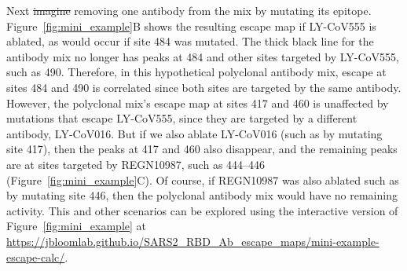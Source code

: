 \documentclass[9pt,twocolumn,twoside]{gsajnl_modified}
\providecommand{\DIFadd}[1]{{\protect\color{blue}\uwave{#1}}} %
\providecommand{\DIFdel}[1]{{\protect\color{red}\sout{#1}}}                      %
\providecommand{\DIFaddbegin}{} %
\providecommand{\DIFaddend}{} %
\providecommand{\DIFdelbegin}{} %
\providecommand{\DIFdelend}{} %
\begin{document}
Next \DIFdelbegin \DIFdel{imagine }\DIFdelend \DIFaddbegin \DIFadd{consider }\DIFaddend removing one antibody from the \DIFaddbegin \DIFadd{hypothetical }\DIFaddend mix by mutating its epitope.
Figure~\ref{fig:mini_example}B shows the resulting escape map if LY-CoV555 is ablated, as would occur if site 484 was mutated.
The thick black line for the antibody mix no longer has peaks at 484 and other sites targeted by LY-CoV555, such as 490.
Therefore, in this hypothetical polyclonal antibody mix, escape at sites 484 and 490 is correlated since both sites are targeted by the same antibody.
However, the polyclonal mix's escape map at sites 417 and 460 is unaffected by mutations that escape LY-CoV555, since they are targeted by a different antibody, LY-CoV016.
But if we also ablate LY-CoV016 (such as by mutating site 417), then the peaks at 417 and 460 also disappear, and the remaining peaks are at sites targeted by REGN10987, such as 444--446 (Figure~\ref{fig:mini_example}C).
Of course, if REGN10987 was also ablated such as by mutating site 446, then the polyclonal antibody mix would have no remaining activity.
This and other scenarios can be explored using the interactive version of Figure~\ref{fig:mini_example} at \url{https://jbloomlab.github.io/SARS2_RBD_Ab_escape_maps/mini-example-escape-calc/}.
\end{document}
